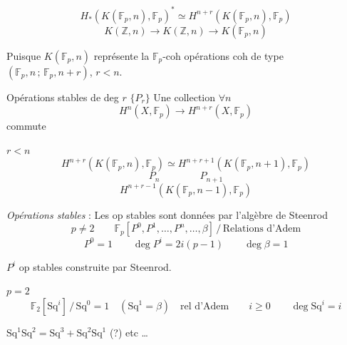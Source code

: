 \documentclass[11pt,a4paper]{article}
\begin{document}

\[
  H_{\ast}(K(\mathbb{F}_p,n),\mathbb{F}_p)^{\ast} \simeq
  H^{n+r}(K(\mathbb{F}_p,n),\mathbb{F}_p)
\]
\[
  K(\mathbb{Z},n) \to K(\mathbb{Z},n) \to K(\mathbb{F}_p,n)
\]

Puisque $K(\mathbb{F}_p,n)$ représente la $\mathbb{F}_p$-coh
opérations coh de type $(\mathbb{F}_p,n\,;\,\mathbb{F}_p,n+r)$, \quad $r<n$.

Opérations stables de deg $r$ \quad $\{P_r\}$ \quad Une collection $\forall n$
\[
  H^n(X,\mathbb{F}_p) \longrightarrow H^{n+r}(X,\mathbb{F}_p)
\]
commute



$r<n$
\[
  H^{n+r}(K(\mathbb{F}_p,n),\mathbb{F}_p) \simeq
  H^{n+r+1}(K(\mathbb{F}_p,n+1),\mathbb{F}_p)
\]
\[
  P_n \qquad\qquad P_{n+1}
\]
\[
  H^{n+r-1}(K(\mathbb{F}_p,n-1),\mathbb{F}_p)
\]

\emph{Opérations stables} : Les op stables sont \struck{\ill{}} données par l'algèbre de Steenrod
\[
  p \neq 2 \qquad
  \mathbb{F}_p[P^0, P^1, \ldots, P^n, \ldots, \beta]\,/\,\text{Relations d'Adem}
\]
\[
  P^0 = 1 \qquad \deg P^i = 2i(p-1) \qquad \deg\beta = 1
\]



$P^i$ op stables construite par Steenrod.

$p=2$
\[
  \mathbb{F}_2[\mathrm{Sq}^i]\,/\,\mathrm{Sq}^0 = 1 \quad (\mathrm{Sq}^1 = \beta) \quad \text{rel d'Adem}
  \qquad i \geq 0 \qquad \deg \mathrm{Sq}^i = i
\]

 \qquad
{} \quad
$\mathrm{Sq}^1\mathrm{Sq}^2 = \mathrm{Sq}^3 + \mathrm{Sq}^2\mathrm{Sq}^1$ (?) etc …
\end{document}
